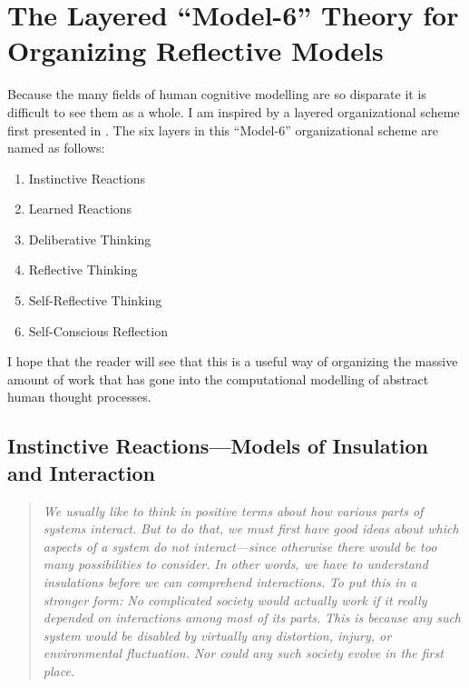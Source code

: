 \section{The Layered ``Model-6'' Theory for Organizing Reflective Models}

Because the many fields of human cognitive modelling are so disparate
it is difficult to see them as a whole.  I am inspired by a layered
organizational scheme first presented in \cite{minsky:2006}.  The
six layers in this ``Model-6'' organizational scheme are named as
follows:

\begin{enumerate}
\item{Instinctive Reactions}
\item{Learned Reactions}
\item{Deliberative Thinking}
\item{Reflective Thinking}
\item{Self-Reflective Thinking}
\item{Self-Conscious Reflection}
\end{enumerate}

I hope that the reader will see that this is a useful way of
organizing the massive amount of work that has gone into the
computational modelling of abstract human thought processes.

\subsection{Instinctive Reactions---Models of Insulation and Interaction}

\begin{quotation}
  \emph{We usually like to think in positive terms about how various parts of systems interact.}
  \emph{But to do that, we must first have good ideas about which aspects of a system do \emph{not} interact---since otherwise there would be too many possibilities to consider.}
  \emph{In other words, we have to understand \emph{insulations} before we can comprehend interactions.}
  \emph{To put this in a stronger form: \emph{No complicated society would actually work if it really depended on interactions among most of its parts}.}
  \emph{This is because any such system would be disabled by virtually any distortion, injury, or environmental fluctuation.}
  \emph{Nor could any such society evolve in the first place.}
\end{quotation}  

{}

